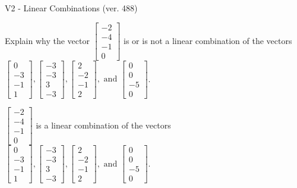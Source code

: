 \begin{exercise}
  \begin{exerciseTitle}V2 - Linear Combinations (ver. 488)\end{exerciseTitle}
  \begin{exerciseStatement}
    Explain why the vector \(\left[\begin{array}{c}
-2 \\
-4 \\
-1 \\
0
\end{array}\right]\)  is or is not a linear 
	combination of the vectors \(\left[\begin{array}{c}
0 \\
-3 \\
-1 \\
1
\end{array}\right] , \left[\begin{array}{c}
-3 \\
-3 \\
3 \\
-3
\end{array}\right] , \left[\begin{array}{c}
2 \\
-2 \\
-1 \\
2
\end{array}\right] , \text{ and } \left[\begin{array}{c}
0 \\
0 \\
-5 \\
0
\end{array}\right]\).
	


  \end{exerciseStatement}
  \begin{exerciseAnswer}
   \(\left[\begin{array}{c}
-2 \\
-4 \\
-1 \\
0
\end{array}\right]\) 
  	 is  
	a linear combination of the vectors \(\left[\begin{array}{c}
0 \\
-3 \\
-1 \\
1
\end{array}\right] , \left[\begin{array}{c}
-3 \\
-3 \\
3 \\
-3
\end{array}\right] , \left[\begin{array}{c}
2 \\
-2 \\
-1 \\
2
\end{array}\right] , \text{ and } \left[\begin{array}{c}
0 \\
0 \\
-5 \\
0
\end{array}\right]\).


\end{exerciseAnswer}
\end{exercise}
